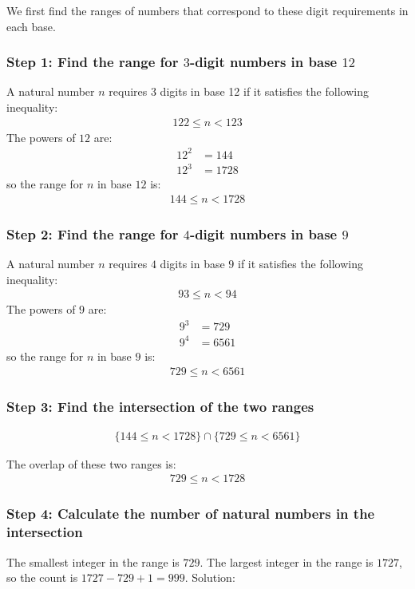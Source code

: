 We first find the ranges of numbers that correspond to these digit requirements in each base.

\subsubsection*{Step 1: Find the range for $3$-digit numbers in base $12$}

A natural number $n$ requires $3$ digits in base 12 if it satisfies the following inequality:
\begin{align*}
122 \le n < 123
\end{align*}
The powers of $12$ are:
\begin{align*}
12^{2} & = 144
\\
12^{3} & = 1728
\end{align*}
so the range for $n$ in base $12$ is:
\begin{align*}
144 \le n < 1728
\end{align*}

\subsubsection*{Step 2: Find the range for $4$-digit numbers in base $9$}

A natural number $n$ requires $4$ digits in base $9$ if it satisfies the following inequality:
\begin{align*}
93 \le n < 94
\end{align*}
The powers of $9$ are:
\begin{align*}
9^{3} & = 729
\\
9^{4} & = 6561
\end{align*}
so the range for $n$ in base $9$ is:
\begin{align*}
729 \le n < 6561
\end{align*}

\subsubsection*{Step 3: Find the intersection of the two ranges}
\begin{align*}
\{ 144 \le n < 1728 \} 
\cap
\{ 729 \le n < 6561 \}
\end{align*}

The overlap of these two ranges is:
\begin{align*}
729 \le n < 1728
\end{align*}

\subsubsection*{Step 4: Calculate the number of natural numbers in the intersection}

The smallest integer in the range is $729$. The largest integer in the range is $1727$, so the count is $1727−729+1=999$. Solution: 
